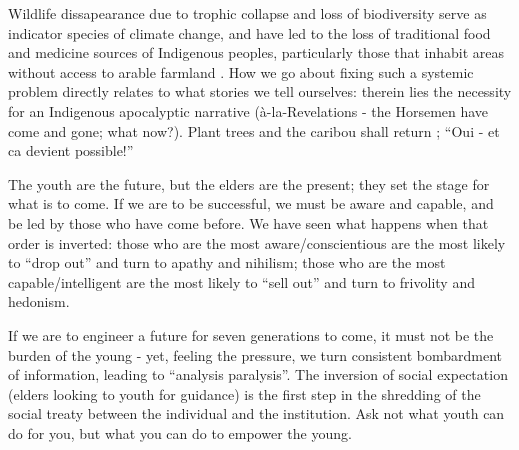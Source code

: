 \documentclass{report}
\begin{document}
Wildlife dissapearance due to trophic collapse and loss of biodiversity serve as indicator species of climate change, and have led to the loss of traditional food and medicine sources of Indigenous peoples, particularly those that inhabit areas without access to arable farmland \parencite{jonassangris}. How we go about fixing such a systemic problem directly relates to what stories we tell ourselves: therein lies the necessity for an Indigenous apocalyptic narrative (à-la-Revelations - the Horsemen have come and gone; what now?). Plant trees and the caribou shall return \parencite{nwtcaribou}; ``Oui - et ca devient possible!''

The youth are the future, but the elders are the present; they set the stage for what is to come. If we are to be successful, we must be aware and capable, and be led by those who have come before. We have seen what happens when that order is inverted: those who are the most aware/conscientious are the most likely to ``drop out'' and turn to apathy and nihilism; those who are the most capable/intelligent are the most likely to ``sell out'' and turn to frivolity and hedonism.

If we are to engineer a future for seven generations to come, it must not be the burden of the young - yet, feeling the pressure, we turn consistent bombardment of information, leading to ``analysis paralysis''. The inversion of social expectation (elders looking to youth for guidance) is the first step in the shredding of the social treaty between the individual and the institution. Ask not what youth can do for you, but what you can do to empower the young.

\clearpage

\printbibliography
\end{document}
